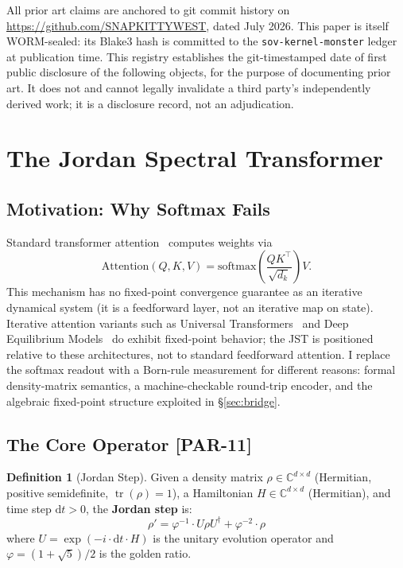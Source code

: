 \documentclass[12pt, letterpaper]{article}
\theoremstyle{plain}
\theoremstyle{definition}
\newtheorem{definition}[theorem]{Definition}
\theoremstyle{remark}
\newcommand{\phiinv}{\varphi^{-1}}
\newcommand{\phiinvsq}{\varphi^{-2}}
\newcommand{\prior}[1]{\textcolor{SovGold}{\textbf{[PAR-#1]}}}
\begin{document}
\begin{wormbox}
All prior art claims are anchored to git commit history on
\url{https://github.com/SNAPKITTYWEST}, dated July 2026.
This paper is itself WORM-sealed: its Blake3 hash is committed to the
\texttt{sov-kernel-monster} ledger at publication time.
This registry establishes the git-timestamped date of first public disclosure
of the following objects, for the purpose of documenting prior art.
It does not and cannot legally invalidate a third party's independently derived
work; it is a disclosure record, not an adjudication.
\end{wormbox}

\section{The Jordan Spectral Transformer}

\subsection{Motivation: Why Softmax Fails}

Standard transformer attention~\cite{vaswani2017attention} computes weights via
\[
  \text{Attention}(Q, K, V) = \text{softmax}\!\left(\frac{QK^\top}{\sqrt{d_k}}\right)V.
\]
This mechanism has no fixed-point convergence guarantee as an iterative dynamical system
(it is a feedforward layer, not an iterative map on state).
Iterative attention variants such as Universal Transformers~\cite{dehghani2018universal}
and Deep Equilibrium Models~\cite{bai2019deep} do exhibit fixed-point behavior;
the JST is positioned relative to these architectures, not to standard feedforward attention.
I replace the softmax readout with a Born-rule measurement for different reasons:
formal density-matrix semantics, a machine-checkable round-trip encoder, and
the algebraic fixed-point structure exploited in \S\ref{sec:bridge}.

\subsection{The Core Operator \prior{11}}

\begin{definition}[Jordan Step]
Given a density matrix $\rho \in \mathbb{C}^{d \times d}$ (Hermitian, positive
semidefinite, $\operatorname{tr}(\rho) = 1$), a Hamiltonian
$H \in \mathbb{C}^{d \times d}$ (Hermitian), and time step $\mathrm{d}t > 0$,
the \textbf{Jordan step} is:
\begin{equation}
  \boxed{\rho' = \phiinv \cdot U\rho U^\dagger + \phiinvsq \cdot \rho}
  \label{eq:jordan_step}
\end{equation}
where $U = \exp(-i \cdot \mathrm{d}t \cdot H)$ is the unitary evolution operator
and $\varphi = (1 + \sqrt{5})/2$ is the golden ratio.
\end{definition}
\end{document}
